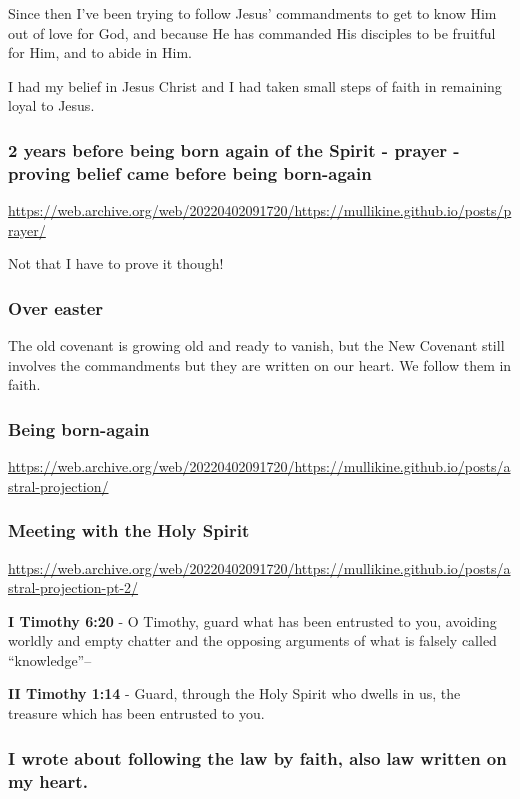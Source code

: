 \documentclass[11pt]{article}
\begin{document}
Since then I've been trying to follow Jesus' commandments to get to know Him out of love for God, and because He has commanded His disciples to be fruitful for Him, and to abide in Him.

I had my belief in Jesus Christ and I had taken small steps of faith in remaining loyal to Jesus.

\subsubsection{2 years before being born again of the Spirit - prayer - proving belief came before being born-again}
\label{sec:orgaa26f67}
\url{https://web.archive.org/web/20220402091720/https://mullikine.github.io/posts/prayer/}

Not that I have to prove it though!

\subsubsection{Over easter}
\label{sec:org6c2a43b}
The old covenant is growing old and ready to vanish, but the New Covenant still involves the commandments but they are written on our heart.
We follow them in faith.

\subsubsection{Being born-again}
\label{sec:orgf77c039}
\url{https://web.archive.org/web/20220402091720/https://mullikine.github.io/posts/astral-projection/}

\subsubsection{Meeting with the Holy Spirit}
\label{sec:org8fdabc9}
\url{https://web.archive.org/web/20220402091720/https://mullikine.github.io/posts/astral-projection-pt-2/}

\textbf{I Timothy 6:20} - O Timothy, guard what has been entrusted to you, avoiding worldly and empty chatter and the opposing arguments of what is falsely called “knowledge”--

\textbf{II Timothy 1:14} - Guard, through the Holy Spirit who dwells in us, the treasure which has been entrusted to you.

\subsubsection{I wrote about following the law by faith, also law written on my heart.}
\label{sec:org3b84e77}
\end{document}

